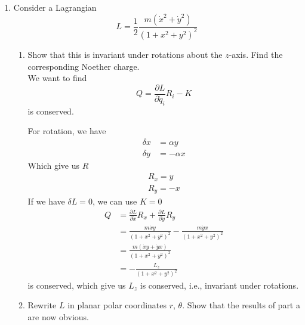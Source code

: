 \documentclass{article}
\begin{document}
\begin{enumerate}
\begin{enumerate}
    \end{enumerate}
    \item Consider a Lagrangian
    \[
    L = \frac{1}{2}\frac{m(\dot x^2 + \dot y^2)}{(1+ x^2 + y^2)^2}
    \]
    \begin{enumerate}
        \item Show that this is invariant under rotations about the $z$-axis. Find the corresponding Noether charge.\\

        We want to find
        \[
        Q = \frac{\partial L}{\partial \dot q_i} R_i - K
        \]
        is conserved.

        For rotation, we have
        \begin{align*}
            \delta x &= \alpha y \\
            \delta y &= -\alpha x
        \end{align*}
        Which give us $R$
        \begin{align*}
            R_x = y \\
            R_y = -x
        \end{align*}
        If we have $\delta L = 0$, we can use $K = 0$
        \begin{align*}
           Q &= \frac{\partial L}{\partial \dot x} R_x + \frac{\partial L}{\partial \dot y}R_y \\
                  &= \frac{m\dot x y }{(1+x^2+y^2)^2} - \frac{m\dot y x }{(1+x^2+y^2)^2} \\
                    &= \frac{m(\dot x y + \dot y x)}{(1+x^2+y^2)^2} \\
                    &= -\frac{L_z}{(1+x^2+y^2)^2}
        \end{align*}
        is conserved, which give us $L_z$ is conserved, i.e., invariant under rotations.


        

        \item Rewrite $L$ in planar polar coordinates $r$, $\theta$. Show that the results of part a are now obvious.\\


\end{enumerate}
\end{enumerate}
\end{document}
